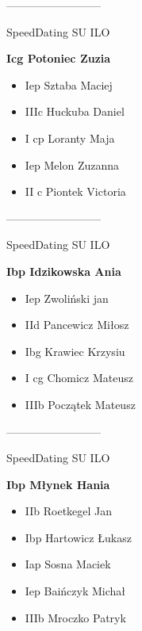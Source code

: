 \documentclass[a4paper,10pt]{article}
\begin{document}
\begin{multicols}{3}
\begin{minipage}[l]{\textwidth}
\end{minipage}



\begin{minipage}[l]{\textwidth}
--------------------------

  \footnotesize{SpeedDating SU ILO}

  \bfseries{Icg Potoniec Zuzia}

  \begin{itemize}
    \item Iep Sztaba Maciej
    \item IIIc Huckuba Daniel
    \item I cp Loranty Maja
    \item Iep Melon Zuzanna
    \item II c Piontek Victoria

    \end{itemize}



\end{minipage}



\begin{minipage}[l]{\textwidth}
--------------------------

  \footnotesize{SpeedDating SU ILO}

  \bfseries{Ibp Idzikowska Ania}

  \begin{itemize}
    \item Iep Zwoliński jan
    \item IId Pancewicz Miłosz
    \item Ibg Krawiec Krzysiu
    \item I cg Chomicz Mateusz
    \item IIIb Początek Mateusz

    \end{itemize}



\end{minipage}



\begin{minipage}[l]{\textwidth}
--------------------------

  \footnotesize{SpeedDating SU ILO}

  \bfseries{Ibp Młynek Hania}

  \begin{itemize}
    \item IIb Roetkegel Jan
    \item Ibp Hartowicz Łukasz
    \item Iap Sosna Maciek
    \item Iep Baińczyk Michał
    \item IIIb Mroczko Patryk


\end{itemize}
\end{minipage}
\end{multicols}
\end{document}
